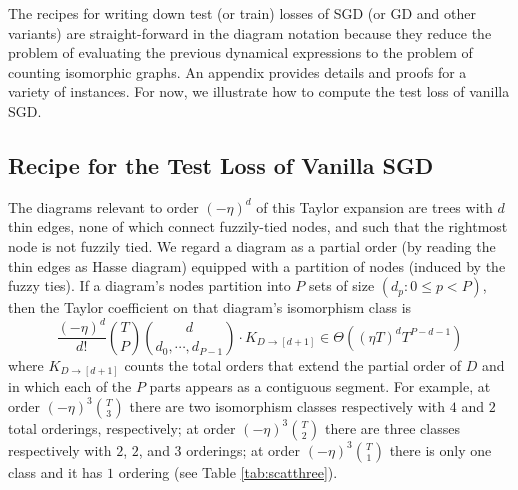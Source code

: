 \documentclass{article}
\begin{document}
    The recipes for writing down test (or train) losses of SGD (or GD and other
    variants) are straight-forward in the diagram notation because they reduce
    the problem of evaluating the previous dynamical expressions to the problem
    of counting isomorphic graphs.  An appendix provides details and proofs for
    a variety of instances.  For now, we illustrate how to compute the test
    loss of vanilla SGD.

\subsection{Recipe for the Test Loss of Vanilla SGD}
    The diagrams relevant to order $(-\eta)^d$ of this Taylor expansion are
    trees with $d$ thin edges, none of which connect fuzzily-tied nodes, and
    such that the rightmost node is not fuzzily tied.  We regard a diagram as a
    partial order (by reading the thin edges as Hasse diagram) equipped with a
    partition of nodes (induced by the fuzzy ties).  If a diagram's nodes
    partition into $P$ sets of size $(d_p: 0\leq p < P)$, then the Taylor
    coefficient on that diagram's isomorphism class is
    $$
        \frac{(-\eta)^d}{d!} {T \choose P} {d \choose d_0, \cdots, d_{P-1}}
        \cdot 
        K_{D \to [d+1]}
        \in
        \Theta\left((\eta T)^d T^{P-d-1}\right)
    $$
    where $K_{D \to [d+1]}$ counts the total orders that extend the partial
    order of $D$ and in which each of the $P$ parts appears as a contiguous
    segment.  For example, at order $(-\eta)^3 {T \choose 3}$ there are two
    isomorphism classes respectively with $4$ and $2$ total orderings,
    respectively; at order $(-\eta)^3 {T \choose 2}$ there are three classes
    respectively with $2$, $2$, and $3$ orderings; at order $(-\eta)^3 {T
    \choose 1}$ there is only one class and it has $1$ ordering (see Table
    \ref{tab:scatthree}).
\end{document}
